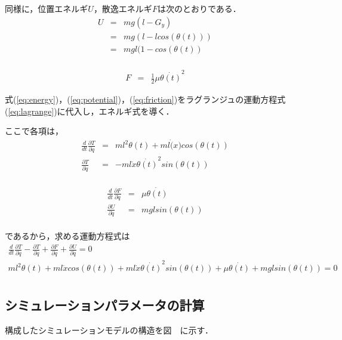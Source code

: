 \documentclass[dvipdfmx,titlepage,a4j]{jsarticle}  %
\begin{document}
同様に，位置エネルギ$U$，散逸エネルギ$F$は次のとおりである．
\begin{eqnarray}
  U &=& mg(l - G_y) \nonumber \\
  &=& mg(l - l cos(\theta(t))) \nonumber \\
  &=& mgl(1 - cos(\theta(t)) \label{eq:potential}\\
\end{eqnarray}

\begin{eqnarray}
  F &=& \frac{1}{2} \mu  \dot{\theta(t)}^2 \label{eq:friction}
\end{eqnarray}

式(\ref{eq:energy})，(\ref{eq:potential})，(\ref{eq:friction})をラグランジュの運動方程式(\ref{eq:lagrange})に代入し，エネルギ式を導く．

ここで各項は，
\begin{eqnarray}
  \frac{d}{dt} \frac{\partial T}{\partial \dot{q}} &=& m l^2 \theta(t) + m l \dot(x) cos(\theta(t)) \nonumber \\
  \frac{\partial T}{\partial \dot{q}} &=&  -m l \dot x \dot{\theta(t)}^2 sin(\theta(t))\nonumber \\
\end{eqnarray}

\begin{eqnarray}
  \frac{d}{dt} \frac{\partial F}{\partial \dot{q}} &=&  \mu \dot{\theta(t)} \nonumber \\
  \frac{\partial U}{\partial \dot{q}} &=&  mgl sin(\theta(t)) \nonumber \\
\end{eqnarray}

であるから，求める運動方程式は
\begin{eqnarray}
  \frac{d}{dt} \frac{\partial T}{\partial \dot{q}} - \frac{\partial T}{\partial q} + \frac{\partial F}{\partial \dot q} + \frac{\partial U}{\partial \dot q} = 0 \nonumber \\
  m l^2 \theta(t) + m l \dot x cos(\theta(t)) + m l \dot x \dot{\theta(t)}^2 sin(\theta(t)) + \mu \dot{\theta(t)} + mgl sin(\theta(t)) = 0 \nonumber \\
\end{eqnarray}

\subsection{シミュレーションパラメータの計算}
構成したシミュレーションモデルの構造を図　に示す．
\end{document}
